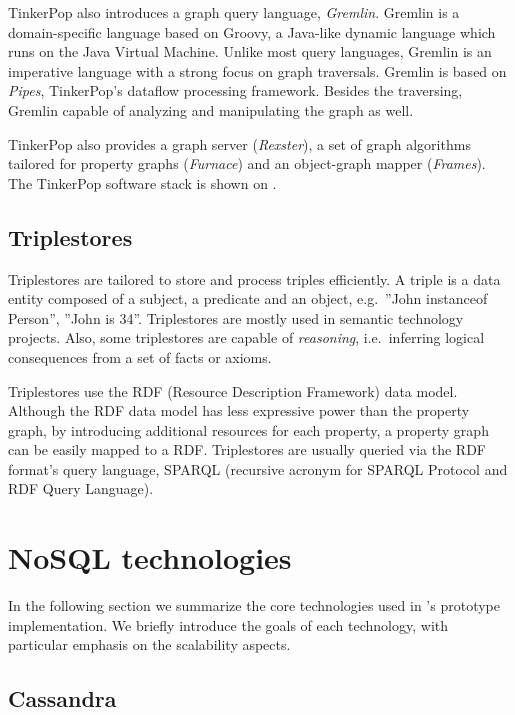  
TinkerPop also introduces a graph query language, \textit{Gremlin}. Gremlin is a domain-specific language based on Groovy, a Java-like dynamic language which runs on the Java Virtual Machine. Unlike most query languages, Gremlin is an imperative language with a strong focus on graph traversals. Gremlin is based on \textit{Pipes}, TinkerPop's dataflow processing framework. Besides the traversing, Gremlin capable of analyzing and manipulating the graph as well.

TinkerPop also provides a graph server (\textit{Rexster}), a set of graph algorithms tailored for property graphs (\textit{Furnace}) and an object-graph mapper (\textit{Frames}). The TinkerPop software stack is shown on .


\subsection{Triplestores}

Triplestores are tailored to store and process triples efficiently. A triple is a data entity composed of a subject, a predicate and an object, e.g.\ ''John instanceof Person'', ''John is 34''. Triplestores are mostly used in semantic technology projects. Also, some triplestores are capable of \emph{reasoning}, i.e.\ inferring logical consequences from a set of facts or axioms. 

Triplestores use the RDF (Resource Description Framework) data model. Although the RDF data model has less expressive power than the property graph, by introducing additional resources for each property, a property graph can be easily mapped to a RDF. Triplestores are usually queried via the RDF format's query language, SPARQL (recursive acronym for SPARQL Protocol and RDF Query Language). 

\section{NoSQL technologies}

In the following section we summarize the core technologies used in \iqd's prototype implementation. We briefly introduce the goals of each technology, with particular emphasis on the scalability aspects.
 
\subsection{Cassandra}

